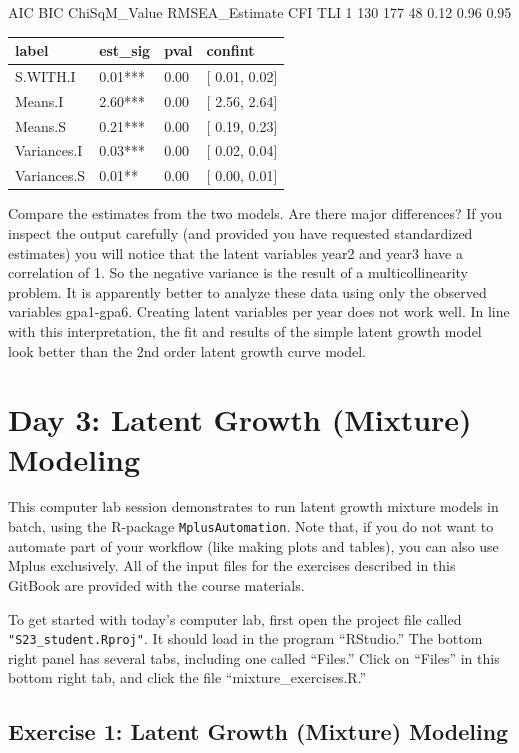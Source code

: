 \documentclass[
]{book}
\begin{document}
AIC BIC ChiSqM\_Value RMSEA\_Estimate CFI TLI
1 130 177 48 0.12 0.96 0.95

\begin{tabular}[t]{l|l|l|l}
\hline
label & est\_sig & pval & confint\\
\hline
S.WITH.I & 0.01*** & 0.00 & [ 0.01,  0.02]\\
\hline
Means.I & 2.60*** & 0.00 & [ 2.56,  2.64]\\
\hline
Means.S & 0.21*** & 0.00 & [ 0.19,  0.23]\\
\hline
Variances.I & 0.03*** & 0.00 & [ 0.02,  0.04]\\
\hline
Variances.S & 0.01** & 0.00 & [ 0.00,  0.01]\\
\hline
\end{tabular}

Compare the estimates from the two models. Are there major differences?
If you inspect the output carefully (and provided you have requested standardized
estimates) you will notice that the latent variables year2 and year3 have a correlation of 1.
So the negative variance is the result of a multicollinearity problem. It is apparently better to
analyze these data using only the observed variables gpa1-gpa6. Creating latent variables
per year does not work well.
In line with this interpretation, the fit and results of the simple latent growth model look better than the 2nd order latent growth curve model.

\hypertarget{day-3-latent-growth-mixture-modeling}{%
\chapter{Day 3: Latent Growth (Mixture) Modeling}\label{day-3-latent-growth-mixture-modeling}}

This computer lab session demonstrates to run latent growth mixture models in batch, using the R-package \texttt{MplusAutomation}.
Note that, if you do not want to automate part of your workflow (like making plots and tables), you can also use Mplus exclusively.
All of the input files for the exercises described in this GitBook are provided with the course materials.

To get started with today's computer lab, first open the project file called \texttt{"S23\_student.Rproj"}. It should load in the program ``RStudio.'' The bottom right panel has several tabs, including one called ``Files.'' Click on ``Files'' in this bottom right tab, and click the file ``mixture\_exercises.R.''

\hypertarget{exercise-1-latent-growth-mixture-modeling}{%
\section{Exercise 1: Latent Growth (Mixture) Modeling}\label{exercise-1-latent-growth-mixture-modeling}}
\end{document}
